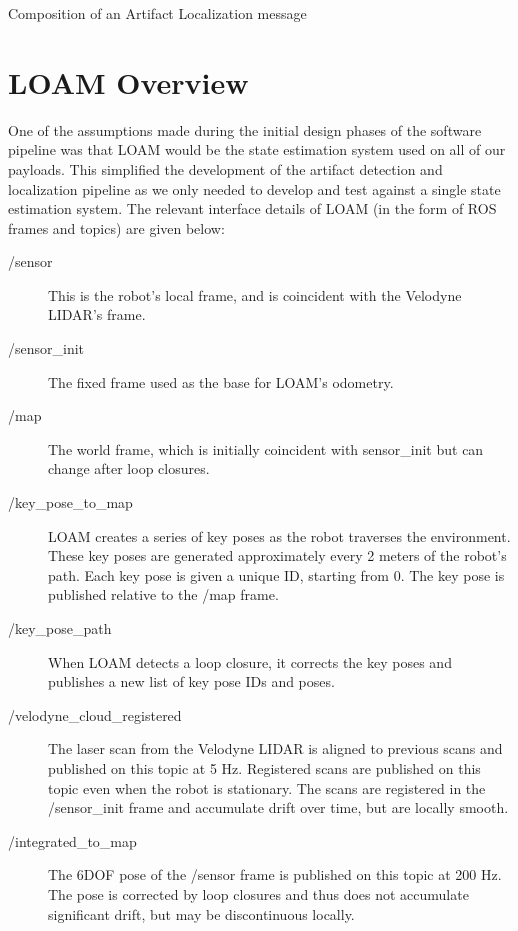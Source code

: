 \begin{table}
	\centering
	\begin{adjustbox}{max width=.95\textwidth}
	\end{adjustbox}
	\caption{Composition of an Artifact Localization message}
	\label{artifact_localization}
\end{table}

\section{LOAM Overview}

One of the assumptions made during the initial design phases of the software pipeline was that LOAM \cite{zhang2014loam} would be the state estimation system used on all of our payloads. This simplified the development of the artifact detection and localization pipeline as we only needed to develop and test against a single state estimation system. The relevant interface details of LOAM (in the form of ROS \cite{quigley2009ros} frames and topics) are given below:

\begin{description}
	\item[/sensor] This is the robot's local frame, and is coincident with the Velodyne LIDAR's frame.
	\item[/sensor\_init] The fixed frame used as the base for LOAM's odometry.
	\item[/map] The world frame, which is initially coincident with sensor\_init but can change after loop closures.
	\item[/key\_pose\_to\_map] LOAM creates a series of key poses as the robot traverses the environment. These key poses are generated approximately every 2 meters of the robot's path. Each key pose is given a unique ID, starting from 0. The key pose is published relative to the /map frame.
	\item[/key\_pose\_path] When LOAM detects a loop closure, it corrects the key poses and publishes a new list of key pose IDs and poses.
	\item[/velodyne\_cloud\_registered] The laser scan from the Velodyne LIDAR is aligned to previous scans and published on this topic at 5 Hz. Registered scans are published on this topic even when the robot is stationary. The scans are registered in the /sensor\_init frame and accumulate drift over time, but are locally smooth.
	\item[/integrated\_to\_map] The 6DOF pose of the /sensor frame is published on this topic at 200 Hz. The pose is corrected by loop closures and thus does not accumulate significant drift, but may be discontinuous locally.
\end{description}

